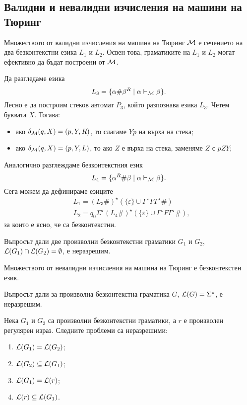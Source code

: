 \subsection*{Валидни и невалидни изчисления на машини на Тюринг}

\begin{lemma}
  Множеството от валидни изчисления на машина на Тюринг $\mathcal{M}$ е сечението на два безконтекстни езика $L_1$ и $L_2$.
  Освен това, граматиките на $L_1$ и $L_2$ могат ефективно да бъдат построени от $\mathcal{M}$.
\end{lemma}
\begin{hint}
  Да разгледаме езика
  \[L_3 = \{\alpha\#\beta^R \mid \alpha \vdash_{\mathcal{M}} \beta\}.\]
  Лесно е да построим стеков автомат $P_3$, който разпознава езика $L_3$.
  Четем буквата $X$. Тогава:
  \begin{itemize}
  \item 
    ако $\delta_{\mathcal{M}}(q,X) =(p,Y,R)$, то слагаме $Yp$ на върха на стека;
  \item
    ако $\delta_{\mathcal{M}}(q,X) =(p,Y,L)$, то ако $Z$ е върха на стека, заменяме $Z$ с $pZY$;
  \end{itemize}
  Аналогично разглеждаме безконтекстния език
  \[L_4 = \{\alpha^R\#\beta \mid \alpha \vdash_{\mathcal{M}} \beta\}.\]
  Сега можем да дефинираме езиците
  \begin{align*}
    & L_1 = (L_3\#)^\star(\{\varepsilon\}\cup \Gamma^\star F \Gamma^\star\#)\\
    & L_2 = q_0\Sigma^\star(L_4\#)^\star(\{\varepsilon\}\cup \Gamma^\star F \Gamma^\star\#),
  \end{align*}
  за които е ясно, че са безконтекстни.
\end{hint}

\begin{thm}
  Въпросът дали две произволни безконтекстни граматики $G_1$ и $G_2$, $\mathcal{L}(G_1) \cap \mathcal{L}(G_2) = \emptyset$,
  е неразрешим.
\end{thm}

\begin{lemma}
  Множеството от невалидни изчисления на машина на Тюринг е безконтекстен език.
\end{lemma}

\begin{thm}
  Въпросът дали за произволна безконтекстна граматика $G$, $\mathcal{L}(G) = \Sigma^\star$,
  е неразрешим.
\end{thm}

\begin{cor}
  Нека $G_1$ и $G_2$ са произволни безконтекстни граматики, а $r$ е произволен регулярен израз.
  Следните проблеми са неразрешими:
  \begin{enumerate}
  \item 
    $\mathcal{L}(G_1) = \mathcal{L}(G_2)$;
  \item
    $\mathcal{L}(G_2) \subseteq \mathcal{L}(G_1)$;
  \item
    $\mathcal{L}(G_1) = \mathcal{L}(r)$;
  \item
    $\mathcal{L}(r) \subseteq \mathcal{L}(G_1)$.
  \end{enumerate}
\end{cor}

